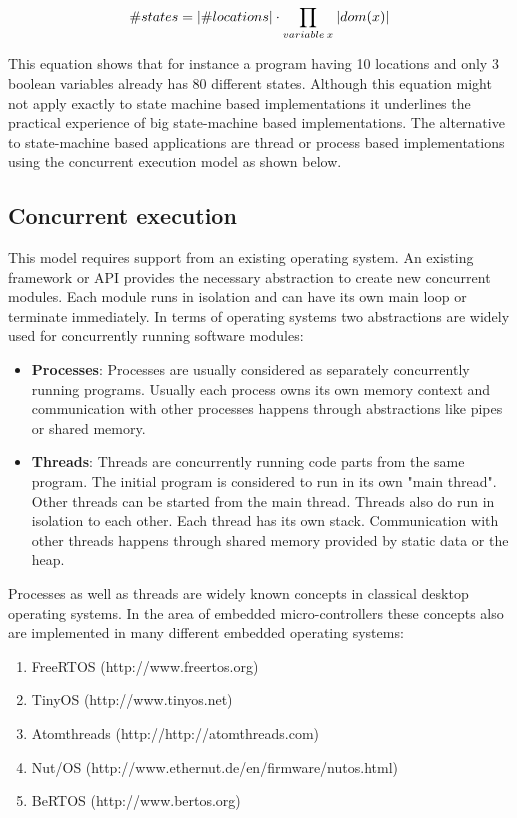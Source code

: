 \begin{equation}
\label{eq:state explosion}
\#states = \lvert\#locations\rvert \cdot \prod_{variable \: x} \: \lvert dom(x)\rvert
\end{equation}

This equation shows that for instance a program having 10 locations and only 3 boolean variables already has 80 different states. Although this equation might not apply exactly to state machine based implementations it underlines the practical experience of big state-machine based implementations. The alternative to state-machine based applications are thread or process based implementations using the concurrent execution model as shown below.

\subsection{Concurrent execution}%
This model requires support from an existing operating system. An existing framework or API provides the necessary abstraction to create new concurrent modules. Each module runs in isolation and can have its own main loop or terminate immediately. In terms of operating systems two abstractions are widely used for concurrently running software modules:

\begin{itemize}
    \item \textbf{Processes}: Processes are usually considered as separately concurrently running programs. Usually each process owns its own memory context and communication with other processes happens through abstractions like pipes or shared memory.
    \item \textbf{Threads}: Threads are concurrently running code parts from the same program. The initial program is considered to run in its own "main thread". Other threads can be started from the main thread. Threads also do run in isolation to each other. Each thread has its own stack. Communication with other threads happens through shared memory provided by static data or the heap.
\end{itemize}

Processes as well as threads are widely known concepts in classical desktop operating systems. In the area of embedded micro-controllers these concepts also are implemented in many different embedded operating systems:

\begin{enumerate}
    \item FreeRTOS (http://www.freertos.org)
    \item TinyOS (http://www.tinyos.net)
    \item Atomthreads (http://http://atomthreads.com)
    \item Nut/OS (http://www.ethernut.de/en/firmware/nutos.html)
    \item BeRTOS (http://www.bertos.org)
\end{enumerate}

